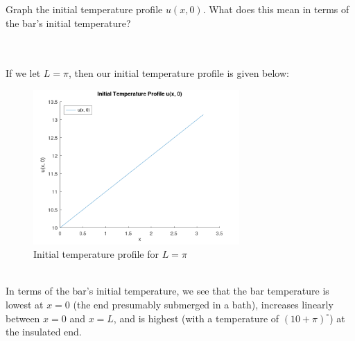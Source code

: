 Graph the initial temperature profile $u(x, 0)$. What does this mean in terms of the bar's initial temperature?

\begin{solution}\ \\\\
    If we let $L = \pi$, then our initial temperature profile is given below:

    \begin{figure}[h]
        \centering
        \includegraphics[width=0.7\textwidth]{problem1b_initial_temperature_profile.png}
        \caption{Initial temperature profile for $L = \pi$}
    \end{figure}
    \ \\

    In terms of the bar's initial temperature, we see that the bar temperature is lowest at $x = 0$ (the end presumably 
    submerged in a bath), increases linearly between $x = 0$ and $x = L$, and is highest (with a temperature of 
    $(10 + \pi)^{\circ}$) at the insulated end.
    \ \\
\end{solution}